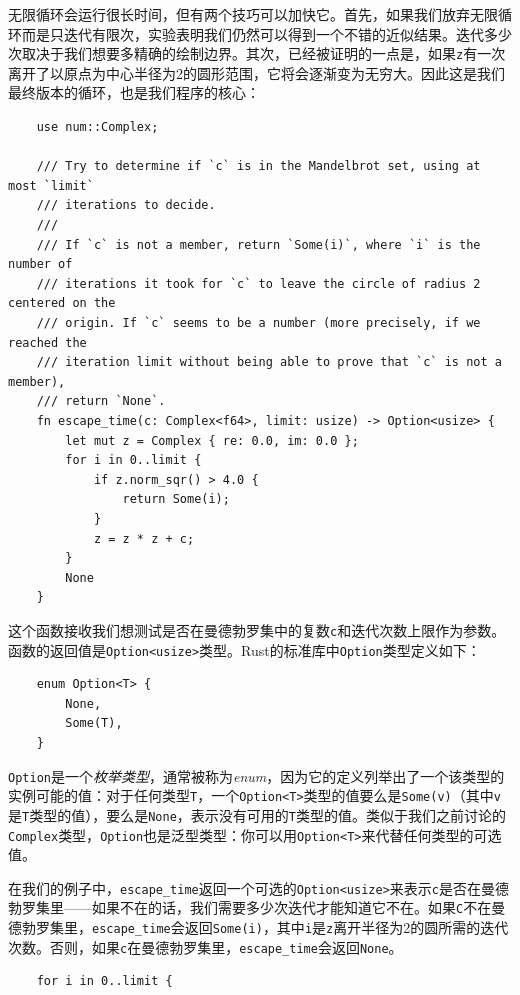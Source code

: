 无限循环会运行很长时间，但有两个技巧可以加快它。首先，如果我们放弃无限循环而是只迭代有限次，实验表明我们仍然可以得到一个不错的近似结果。迭代多少次取决于我们想要多精确的绘制边界。其次，已经被证明的一点是，如果\texttt{z}有一次离开了以原点为中心半径为2的圆形范围，它将会逐渐变为无穷大。因此这是我们最终版本的循环，也是我们程序的核心：
\begin{verbatim}
    use num::Complex;

    /// Try to determine if `c` is in the Mandelbrot set, using at most `limit`
    /// iterations to decide.
    ///
    /// If `c` is not a member, return `Some(i)`, where `i` is the number of
    /// iterations it took for `c` to leave the circle of radius 2 centered on the
    /// origin. If `c` seems to be a number (more precisely, if we reached the
    /// iteration limit without being able to prove that `c` is not a member),
    /// return `None`.
    fn escape_time(c: Complex<f64>, limit: usize) -> Option<usize> {
        let mut z = Complex { re: 0.0, im: 0.0 };
        for i in 0..limit {
            if z.norm_sqr() > 4.0 {
                return Some(i);
            }
            z = z * z + c;
        }
        None
    }
\end{verbatim}

这个函数接收我们想测试是否在曼德勃罗集中的复数\texttt{c}和迭代次数上限作为参数。函数的返回值是\texttt{Option<usize>}类型。Rust的标准库中\texttt{Option}类型定义如下：
\begin{verbatim}
    enum Option<T> {
        None,
        Some(T),
    }
\end{verbatim}

\texttt{Option}是一个\emph{枚举类型}，通常被称为\emph{enum}，因为它的定义列举出了一个该类型的实例可能的值：对于任何类型\texttt{T}，一个\texttt{Option<T>}类型的值要么是\texttt{Some(v)}（其中\texttt{v}是\texttt{T}类型的值），要么是\texttt{None}，表示没有可用的\texttt{T}类型的值。类似于我们之前讨论的\texttt{Complex}类型，\texttt{Option}也是泛型类型：你可以用\texttt{Option<T>}来代替任何类型的可选值。

在我们的例子中，\texttt{escape\_time}返回一个可选的\texttt{Option<usize>}来表示\texttt{c}是否在曼德勃罗集里——如果不在的话，我们需要多少次迭代才能知道它不在。如果\texttt{C}不在曼德勃罗集里，\texttt{escape\_time}会返回\texttt{Some(i)}，其中\texttt{i}是\texttt{z}离开半径为2的圆所需的迭代次数。否则，如果\texttt{c}在曼德勃罗集里，\texttt{escape\_time}会返回\texttt{None}。
\begin{verbatim}
    for i in 0..limit {
\end{verbatim}

